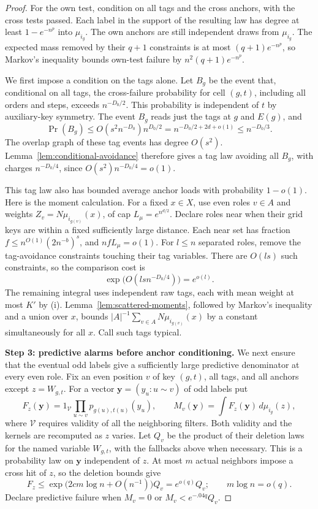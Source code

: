 \begin{proof}
For the own test, condition on all tags and the cross anchors, with the
cross tests passed. Each label in the support of the resulting law has
degree at least \(1-e^{-n^p}\) into \(\mu_{i_g}\). The own anchors are
still independent draws from \(\mu_{i_g}\). The expected mass removed by
their \(q+1\) constraints is at most \((q+1)e^{-n^p}\), so Markov's
inequality bounds own-test failure by \(n^2(q+1)e^{-n^p}\).

We first impose a condition on the tags alone. Let \(B_g\) be the event
that, conditional on all tags, the cross-failure probability for cell
\((g,t)\), including all orders and steps, exceeds \(n^{-D_0/2}\).
This probability is independent of \(t\) by auxiliary-key symmetry.
The event \(B_g\) reads just the tags at \(g\) and \(E(g)\), and
\[
 \Pr(B_g)\le O(s^2n^{-D_0})n^{D_0/2}
 =n^{-D_0/2+2d+o(1)}\le n^{-D_0/3}.
\]
The overlap graph of these tag events has degree \(O(s^2)\).
Lemma~\ref{lem:conditional-avoidance} therefore gives a tag law avoiding
all \(B_g\), with charges \(n^{-D_0/4}\), since
\(O(s^2)n^{-D_0/4}=o(1)\).

This tag law also has bounded average anchor loads with probability
\(1-o(1)\). Here is the moment calculation. For a fixed \(x\in X\),
use even roles \(v\in A\) and weights
\(Z_v=N\mu_{i_{g(v)}}(x)\), of cap \(L_\mu=e^{n^{d/2}}\). Declare
roles near when their grid keys are within a fixed sufficiently large
distance. Each near set has fraction
\(f\le n^{O(1)}(2n^{-b})^s\), and \(nfL_\mu=o(1)\). For \(l\le n\)
separated roles, remove the tag-avoidance constraints touching their tag
variables. There are \(O(ls)\) such constraints, so the comparison cost
is
\[
 \exp\big(O(lsn^{-D_0/4})\big)=e^{o(l)}.
\]
The remaining integral uses independent raw tags, each with mean weight
at most \(K'\) by (i). Lemma~\ref{lem:scattered-moments}, followed by
Markov's inequality and a union over \(x\), bounds
\(|A|^{-1}\sum_{v\in A}N\mu_{i_{g(v)}}(x)\) by a constant
simultaneously for all \(x\). Call such tags typical.

\noindent\textbf{Step 3: predictive alarms before anchor conditioning.}\quad
We next ensure that the eventual odd labels give a sufficiently large
predictive denominator at every even role. Fix an even position \(v\)
of key \((g,t)\), all tags, and all anchors except
\(z=W_{g,t}\). For a vector \(\mathbf y=(y_u:u\sim v)\) of odd labels
put
\[
 F_z(\mathbf y)=1_{\mathcal V}\prod_{u\sim v}p_{g(u),t(u)}(y_u),\qquad
 M_v(\mathbf y)=\int F_z(\mathbf y)\,d\mu_{i_g}(z),
\]
where \(\mathcal V\) requires validity of all the neighboring filters.
Both validity and the kernels are recomputed as \(z\) varies. Let
\(Q_v\) be the product of their deletion laws for the named variable
\(W_{g,t}\), with the fallbacks above when necessary. This is a
probability law on \(\mathbf y\) independent of \(z\). At most \(m\)
actual neighbors impose a cross hit of \(z\), so the deletion bounds give
\[
 F_z\le\exp\big(2cm\log n+O(n^{-1})\big)Q_v=e^{o(q)}Q_v;
 \qquad m\log n=o(q).
\]
Declare predictive failure when \(M_v=0\) or
\(M_v<e^{-.04q}Q_v\).


\end{proof}

